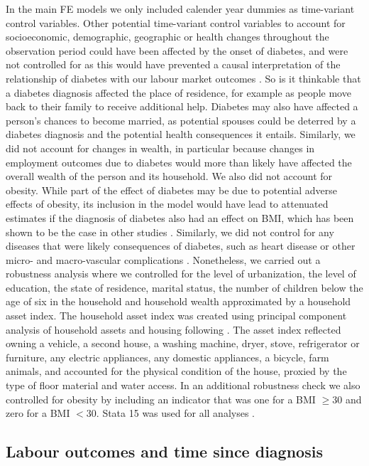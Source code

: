 \documentclass[12pt,english]{article}
\begin{document}
In the main \ac{FE} models we only included calender year dummies as time-variant control variables. Other potential time-variant control variables to account for socioeconomic, demographic, geographic or health changes throughout the observation period could have been affected by the onset of diabetes, and were not controlled for as this would have prevented a causal interpretation of the relationship of diabetes with our labour market outcomes \parencite{Angrist2009a}. So is it thinkable that a diabetes diagnosis affected the place of residence, for example as people move back to their family to receive additional help. Diabetes may also have affected a person's chances to become married, as potential  spouses could be deterred by a diabetes diagnosis and the potential health consequences it entails. Similarly, we did not account for changes in wealth, in particular because changes in employment outcomes due to diabetes would more than likely have affected the overall wealth of the person and its household. We also did not account for obesity. While part of the effect of diabetes may be due to potential adverse effects of obesity, its inclusion in the model would have lead to attenuated estimates if the diagnosis of diabetes also had an effect on \ac{BMI}, which has been shown to be the case in other studies \parencite{Slade2012,DeFineOlivarius2015,Seuring2018}. Similarly, we did not control for any diseases that were likely consequences of diabetes, such as heart disease or other micro- and macro-vascular complications \parencite{WorldHealthOrganization2016}. Nonetheless, we carried out a robustness analysis where we controlled for  the level of urbanization, the level of education, the state of residence, marital status, the number of children below the age of six in the household and household wealth approximated by a household asset index. The household asset index was created using principal component analysis of household assets and housing following \textcite{Filmer2001}. The asset index reflected owning a vehicle, a second house, a washing machine, dryer, stove, refrigerator or furniture, any electric appliances, any domestic appliances, a bicycle, farm animals, and accounted for the physical condition of the house, proxied by the type of floor material and water access. In an additional robustness check we also controlled for obesity by including an indicator that was one for a \ac{BMI} $\geq 30$ and zero for a \ac{BMI} $< 30$. Stata 15 was used for all analyses \parencite{StataCorp2017}.


\subsection{Labour outcomes and time since diagnosis}
\end{document}
